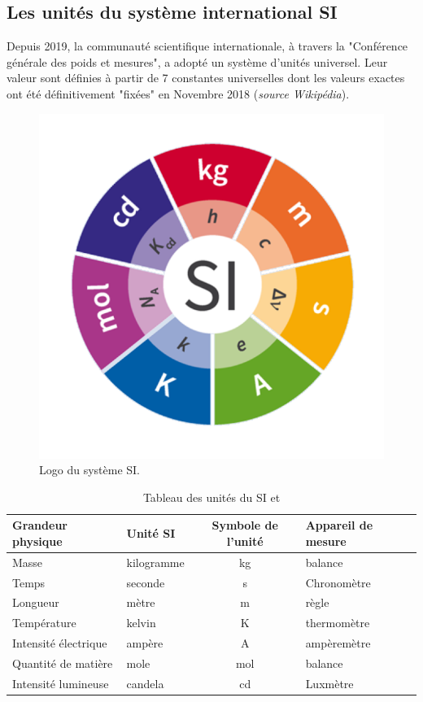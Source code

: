 \subsection{Les unités du système international SI}
Depuis 2019, la communauté scientifique internationale, à travers la "Conférence générale des poids et mesures", a adopté un système d'unités universel. Leur valeur sont définies à partir de 7 constantes universelles dont les valeurs exactes ont été définitivement "fixées" en Novembre 2018 (\textit{source Wikipédia}). 
\begin{figure}[!h]
    \centering\includegraphics[scale=0.4]{Cours/SI_Logo_with_defining_constants.png}
    \caption{Logo du système SI. }
    \label{fig:Syteme_SI}
\end{figure}
\begin{table}[!h]
    \centering
    \begin{tabularx}{\textwidth}{| X | X | c | X |}  \hline
Grandeur physique & Unité SI & Symbole de l'unité & Appareil de mesure \\
\hline
Masse & kilogramme & kg & balance \\
Temps & seconde & s & Chronomètre \\
Longueur & mètre & m & règle \\
Température & kelvin & K & thermomètre \\
Intensité électrique & ampère & A & ampèremètre \\
Quantité de matière & mole & mol & balance\\
Intensité lumineuse & candela & cd & Luxmètre \\
\hline
\end{tabularx}
    \caption{Tableau des unités du SI et}
    \label{tab:SI}
\end{table}
